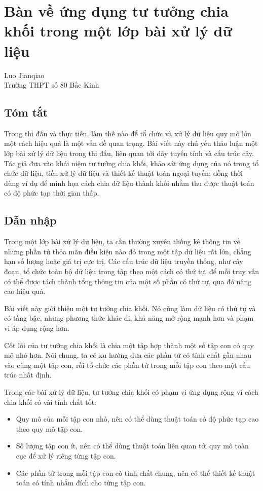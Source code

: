 \documentclass[11pt]{article}
\begin{document}
\section{Bàn về ứng dụng tư tưởng chia khối trong một lớp bài xử lý dữ liệu}

\begin{center}
Luo Jianqiao\\
Trường THPT số 80 Bắc Kinh
\end{center}

\subsection*{Tóm tắt}

Trong thi đấu và thực tiễn, làm thế nào để tổ chức và xử lý dữ liệu quy mô
lớn một cách hiệu quả là một vấn đề quan trọng. Bài viết này chủ yếu thảo
luận một lớp bài xử lý dữ liệu trong thi đấu, liên quan tới dãy tuyến tính và
cấu trúc cây. Tác giả đưa vào khái niệm tư tưởng chia khối, khảo sát ứng dụng
của nó trong tổ chức dữ liệu, tiền xử lý dữ liệu và thiết kế thuật toán ngoại
tuyến; đồng thời dùng ví dụ để minh họa cách chia dữ liệu thành khối nhằm thu
được thuật toán có độ phức tạp thời gian thấp.

\subsection{Dẫn nhập}

Trong một lớp bài xử lý dữ liệu, ta cần thường xuyên thống kê thông tin về
những phần tử thỏa mãn điều kiện nào đó trong một tập dữ liệu rất lớn, chẳng
hạn số lượng hoặc giá trị cực trị. Các cấu trúc dữ liệu truyền thống, như cây
đoạn, tổ chức toàn bộ dữ liệu trong tập theo một cách có thứ tự, để mỗi truy
vấn có thể được tách thành tổng thông tin của một số phần có thứ tự, qua đó
nâng cao hiệu quả.

Bài viết này giới thiệu một tư tưởng chia khối. Nó cũng làm dữ liệu có thứ tự
và có tầng bậc, nhưng phương thức khác đi, khả năng mở rộng mạnh hơn và phạm
vi áp dụng rộng hơn.

Cốt lõi của tư tưởng chia khối là chia một tập hợp thành một số tập con có
quy mô nhỏ hơn. Nói chung, ta có xu hướng đưa các phần tử có tính chất gần
nhau vào cùng một tập con, rồi tổ chức các phần tử trong mỗi tập con theo một
cấu trúc nhất định.

Trong các bài xử lý dữ liệu, tư tưởng chia khối có phạm vi ứng dụng rộng vì
cách chia khối có vài tính chất tốt:
\begin{itemize}
  \item Quy mô của mỗi tập con nhỏ, nên có thể dùng thuật toán có độ phức tạp
  cao theo quy mô tập con.
  \item Số lượng tập con ít, nên có thể dùng thuật toán liên quan tới quy mô
  toàn cục để xử lý riêng từng tập con.
  \item Các phần tử trong mỗi tập con có tính chất chung, nên có thể thiết kế
  thuật toán có tính nhắm đích cho từng tập con.
\end{itemize}
\end{document}
